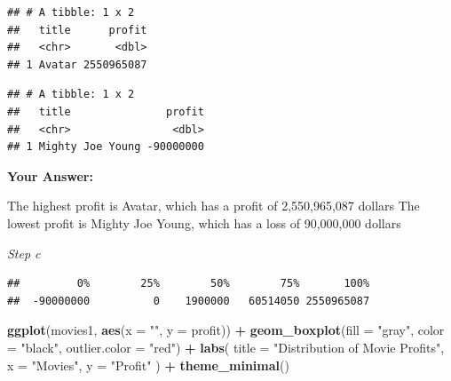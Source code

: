 \documentclass[
]{article}
\newenvironment{Shaded}{\begin{snugshade}}{\end{snugshade}}
\newcommand{\AttributeTok}[1]{\textcolor[rgb]{0.13,0.29,0.53}{#1}}
\newcommand{\ConstantTok}[1]{\textcolor[rgb]{0.56,0.35,0.01}{#1}}
\newcommand{\FunctionTok}[1]{\textcolor[rgb]{0.13,0.29,0.53}{\textbf{#1}}}
\newcommand{\NormalTok}[1]{#1}
\newcommand{\OtherTok}[1]{\textcolor[rgb]{0.56,0.35,0.01}{#1}}
\newcommand{\SpecialCharTok}[1]{\textcolor[rgb]{0.81,0.36,0.00}{\textbf{#1}}}
\newcommand{\StringTok}[1]{\textcolor[rgb]{0.31,0.60,0.02}{#1}}
\begin{document}
\begin{verbatim}
## # A tibble: 1 x 2
##   title      profit
##   <chr>       <dbl>
## 1 Avatar 2550965087
\end{verbatim}

\begin{Shaded}
\end{Shaded}

\begin{verbatim}
## # A tibble: 1 x 2
##   title               profit
##   <chr>                <dbl>
## 1 Mighty Joe Young -90000000
\end{verbatim}

\textbf{Your Answer:}

The highest profit is Avatar, which has a profit of 2,550,965,087
dollars The lowest profit is Mighty Joe Young, which has a loss of
90,000,000 dollars

\emph{Step c}

\begin{Shaded}
\end{Shaded}

\begin{verbatim}
##         0%        25%        50%        75%       100% 
##  -90000000          0    1900000   60514050 2550965087
\end{verbatim}

\begin{Shaded}
\begin{Highlighting}[]
\FunctionTok{ggplot}\NormalTok{(movies1, }\FunctionTok{aes}\NormalTok{(}\AttributeTok{x =} \StringTok{""}\NormalTok{, }\AttributeTok{y =}\NormalTok{ profit)) }\SpecialCharTok{+}
  \FunctionTok{geom\_boxplot}\NormalTok{(}\AttributeTok{fill =} \StringTok{"gray"}\NormalTok{, }\AttributeTok{color =} \StringTok{"black"}\NormalTok{, }\AttributeTok{outlier.color =} \StringTok{"red"}\NormalTok{) }\SpecialCharTok{+}
  \FunctionTok{labs}\NormalTok{(}
    \AttributeTok{title =} \StringTok{"Distribution of Movie Profits"}\NormalTok{,}
    \AttributeTok{x =} \StringTok{"Movies"}\NormalTok{,}
    \AttributeTok{y =} \StringTok{"Profit"}
\NormalTok{  ) }\SpecialCharTok{+}
  \FunctionTok{theme\_minimal}\NormalTok{()}
\end{Highlighting}
\end{Shaded}
\end{document}
